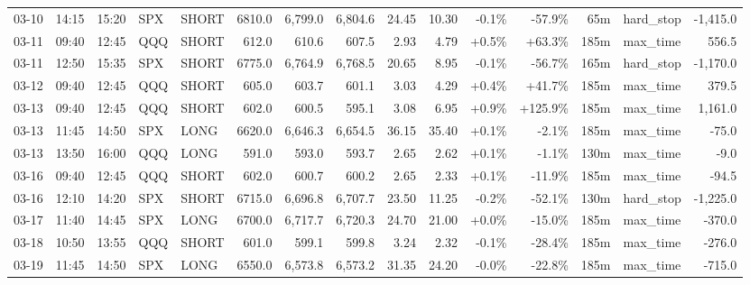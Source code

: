 \documentclass[11pt,a4paper,twoside]{article}
\begin{document}
\begin{landscape}
\begin{center}
\begin{longtable}{>{\color{txtmain}}l l l l l r r r r r r r r >{\color{txtmain}}l r}
03-10 & 14:15 & 15:20 & SPX & SHORT & 6810.0 & 6,799.0 & 6,804.6 & 24.45 & 10.30 & \textcolor{lossred}{-0.1\%} & \textcolor{lossred}{-57.9\%} & 65m & hard\_stop & \textcolor{lossred}{-1,415.0} \\
03-11 & 09:40 & 12:45 & QQQ & SHORT & 612.0 & 610.6 & 607.5 & 2.93 & 4.79 & \textcolor{wingreen}{+0.5\%} & \textcolor{wingreen}{+63.3\%} & 185m & max\_time & \textcolor{wingreen}{556.5} \\
03-11 & 12:50 & 15:35 & SPX & SHORT & 6775.0 & 6,764.9 & 6,768.5 & 20.65 & 8.95 & \textcolor{lossred}{-0.1\%} & \textcolor{lossred}{-56.7\%} & 165m & hard\_stop & \textcolor{lossred}{-1,170.0} \\
03-12 & 09:40 & 12:45 & QQQ & SHORT & 605.0 & 603.7 & 601.1 & 3.03 & 4.29 & \textcolor{wingreen}{+0.4\%} & \textcolor{wingreen}{+41.7\%} & 185m & max\_time & \textcolor{wingreen}{379.5} \\
03-13 & 09:40 & 12:45 & QQQ & SHORT & 602.0 & 600.5 & 595.1 & 3.08 & 6.95 & \textcolor{wingreen}{+0.9\%} & \textcolor{wingreen}{+125.9\%} & 185m & max\_time & \textcolor{wingreen}{1,161.0} \\
03-13 & 11:45 & 14:50 & SPX & LONG & 6620.0 & 6,646.3 & 6,654.5 & 36.15 & 35.40 & \textcolor{wingreen}{+0.1\%} & \textcolor{lossred}{-2.1\%} & 185m & max\_time & \textcolor{lossred}{-75.0} \\
03-13 & 13:50 & 16:00 & QQQ & LONG & 591.0 & 593.0 & 593.7 & 2.65 & 2.62 & \textcolor{wingreen}{+0.1\%} & \textcolor{lossred}{-1.1\%} & 130m & max\_time & \textcolor{lossred}{-9.0} \\
03-16 & 09:40 & 12:45 & QQQ & SHORT & 602.0 & 600.7 & 600.2 & 2.65 & 2.33 & \textcolor{wingreen}{+0.1\%} & \textcolor{lossred}{-11.9\%} & 185m & max\_time & \textcolor{lossred}{-94.5} \\
03-16 & 12:10 & 14:20 & SPX & SHORT & 6715.0 & 6,696.8 & 6,707.7 & 23.50 & 11.25 & \textcolor{lossred}{-0.2\%} & \textcolor{lossred}{-52.1\%} & 130m & hard\_stop & \textcolor{lossred}{-1,225.0} \\
03-17 & 11:40 & 14:45 & SPX & LONG & 6700.0 & 6,717.7 & 6,720.3 & 24.70 & 21.00 & \textcolor{wingreen}{+0.0\%} & \textcolor{lossred}{-15.0\%} & 185m & max\_time & \textcolor{lossred}{-370.0} \\
03-18 & 10:50 & 13:55 & QQQ & SHORT & 601.0 & 599.1 & 599.8 & 3.24 & 2.32 & \textcolor{lossred}{-0.1\%} & \textcolor{lossred}{-28.4\%} & 185m & max\_time & \textcolor{lossred}{-276.0} \\
03-19 & 11:45 & 14:50 & SPX & LONG & 6550.0 & 6,573.8 & 6,573.2 & 31.35 & 24.20 & \textcolor{lossred}{-0.0\%} & \textcolor{lossred}{-22.8\%} & 185m & max\_time & \textcolor{lossred}{-715.0} \\

\end{longtable}
\end{center}
\end{landscape}
\end{document}
